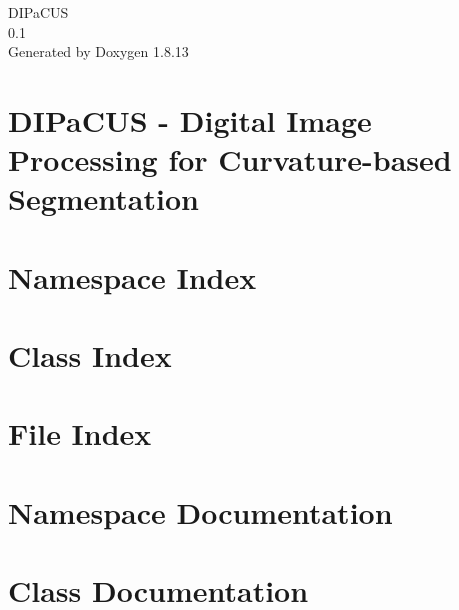 \documentclass[twoside]{book}
\newcommand{\+}{\discretionary{\mbox{\scriptsize$\hookleftarrow$}}{}{}}
\newcommand{\clearemptydoublepage}{%
  \newpage{\pagestyle{empty}\cleardoublepage}%
}
\begin{document}
\hypersetup{pageanchor=false,
             bookmarksnumbered=true,
             pdfencoding=unicode
            }
\begin{titlepage}
\vspace*{7cm}
\begin{center}%
{\Large D\+I\+Pa\+C\+US \\[1ex]\large 0.\+1 }\\
\vspace*{1cm}
{\large Generated by Doxygen 1.8.13}\\
\end{center}
\end{titlepage}
\clearemptydoublepage
{}
\tableofcontents
\clearemptydoublepage
{}
\hypersetup{pageanchor=true}

\chapter{D\+I\+Pa\+C\+US -\/ Digital Image Processing for Curvature-\/based Segmentation}
\label{index}\hypertarget{index}{}
\chapter{Namespace Index}

\chapter{Class Index}

\chapter{File Index}

\chapter{Namespace Documentation}










\chapter{Class Documentation}














\end{document}
